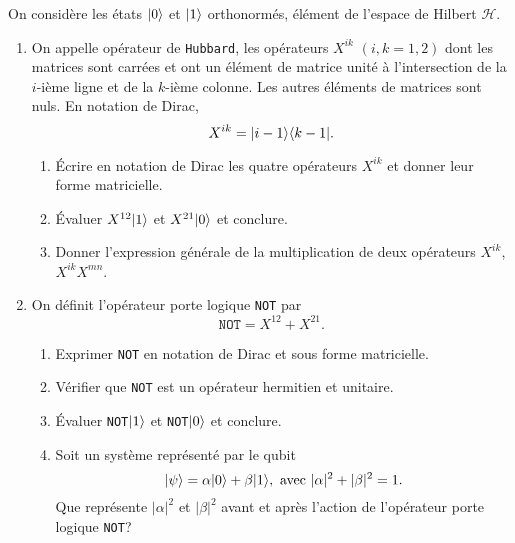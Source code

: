 \begin{exercise}
On considère les états $\vert0\rangle $ et $\vert1\rangle$ orthonormés, élément de l'espace
de Hilbert $\mathcal{H}$.

\begin{enumerate}
\item On appelle opérateur de \texttt{Hubbard}, les opérateurs $X^{ik}$ $(
i,k=1,2)$ dont les matrices sont carrées et ont un élément de matrice unité à
l'intersection de la $i$-ième ligne et de la $k$-ième colonne. Les autres
éléments de matrices sont nuls. En notation de Dirac,
\begin{equation}
X^{ik}=\vert i-1\rangle\langle k-1\vert.
\end{equation}

\begin{enumerate}
\item Écrire en notation de Dirac les quatre opérateurs $X^{ik}$ et donner leur
forme matricielle.

\item Évaluer $X^{12}\vert1\rangle $ et $X^{21}\vert0\rangle$ et conclure.

\item Donner l'expression générale de la multiplication de deux opérateurs
$X^{ik}$, $X^{ik}X^{mn}$.
\end{enumerate}

\item On définit l'opérateur porte logique \texttt{NOT} par%
\begin{equation}
\mathtt{NOT}=X^{12}+X^{21}.
\end{equation}

\begin{enumerate}
\item Exprimer \texttt{NOT} en notation de Dirac et sous forme matricielle.

\item Vérifier que \texttt{NOT} est un opérateur hermitien et unitaire.

\item Évaluer \texttt{NOT}$\vert1\rangle$ et \texttt{NOT}$\vert0\rangle $ et conclure.

\item Soit un système représenté par le qubit%
\begin{equation}
\vert\psi\rangle=\alpha\vert0\rangle +\beta\vert1\rangle,\text{ avec }|\alpha|^2+|\beta|^2=1.
\end{equation}
Que représente $|\alpha|^2$ et $|\beta|^2$ avant et après l'action de
l'opérateur porte logique \texttt{NOT}?
\end{enumerate}
\end{enumerate}
\end{exercise}

